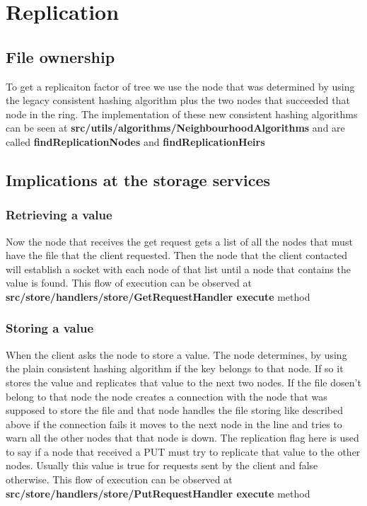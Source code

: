 \section{Replication}

\subsection{File ownership}
To get a replicaiton factor of tree we use the node that was determined by using the legacy consistent hashing algorithm plus the two nodes that succeeded that node in the ring. The implementation of these new consistent hashing algorithms can be seen at \textbf{src/utils/algorithms/NeighbourhoodAlgorithms} and are called \textbf{findReplicationNodes} and \textbf{findReplicationHeirs} 

\subsection{Implications at the storage services}
\subsubsection{Retrieving a value}
Now the node that receives the get request gets a list of all the nodes that must have the file that the client requested. Then the node that the client contacted will establish a socket with each node of that list until a node that contains the value is found. This flow of execution can be observed at \textbf{src/store/handlers/store/GetRequestHandler execute} method

\subsubsection{Storing a value}
When the client asks the node to store a value. The node determines, by using the plain consistent hashing algorithm if the key belongs to that node. If so it stores the value and replicates that value to the next two nodes. If the file dosen't belong to that node the node creates a connection with the node that was supposed to store the file and that node handles the file storing like described above if the connection fails it moves to the next node in the line and tries to warn all the other nodes that that node is down. The replication flag here is used to say if a node that received a PUT must try to replicate that value to the other nodes. Usually this value is true for requests sent by the client and false otherwise. This flow of execution can be observed at \textbf{src/store/handlers/store/PutRequestHandler execute} method

